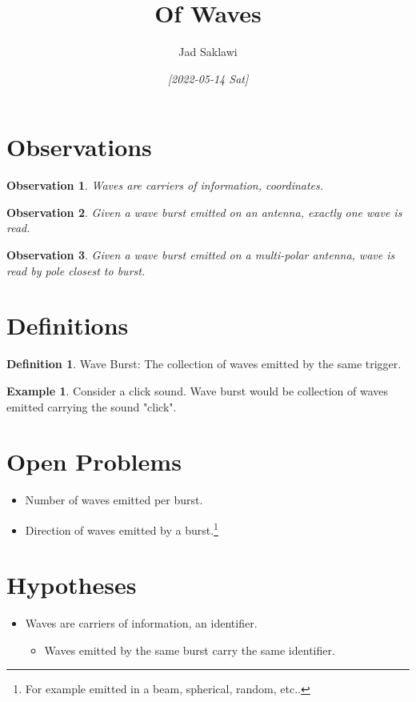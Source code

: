 \documentclass[11pt]{article}
\author{Jad Saklawi}
\date{\textit{[2022-05-14 Sat]}}
\title{Of Waves}
\begin{document}
\maketitle
\newtheorem*{observation}{Observation}
\theoremstyle{definition}
\newtheorem{definition}{Definition}[section]

\theoremstyle{example}
\newtheorem{example}{Example}[section]

\section{Observations}
\label{sec:org2131038}

\begin{observation}
Waves are carriers of information, coordinates.
\end{observation}


\begin{observation}
Given a wave burst emitted on an antenna, exactly one wave is read. %
\end{observation}

\begin{observation} 
Given a wave burst emitted on a multi-polar antenna, wave is read %
   by pole closest to burst. 
\end{observation} 


\newpage
\appendix

\section{Definitions}
\label{sec:org118d024}
\begin{definition}{Wave Burst:}
The collection of waves emitted by the same trigger.
\end{definition}
\begin{example}
Consider a click sound. Wave burst would be collection of waves emitted carrying the sound "click".
\end{example}
\section{Open Problems}
\label{sec:org7c9cdd8}
\begin{itemize}
\item Number of waves emitted per burst.
\item Direction of waves emitted by a burst.\footnote{For example emitted in a beam, spherical, random, etc..}
\end{itemize}
\section{Hypotheses}
\label{sec:orgac9a349}
\begin{itemize}
\item Waves are carriers of information, an identifier.
\begin{itemize}
\item Waves emitted by the same burst carry the same identifier.
\end{itemize}
\end{itemize}
\end{document}

